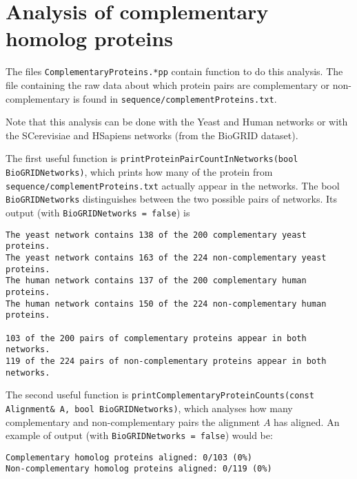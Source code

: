 \documentclass[]{article}
\begin{document}
\section{Analysis of complementary homolog proteins}

The files \texttt{ComplementaryProteins.*pp} contain function to do this analysis. The file containing the raw data about which protein pairs are complementary or non-complementary is found in \texttt{sequence/complementProteins.txt}.

Note that this analysis can be done with the Yeast and Human networks or with the SCerevisiae and HSapiens networks (from the BioGRID dataset).

The first useful function is \texttt{printProteinPairCountInNetworks(bool BioGRIDNetworks)}, which prints how many of the protein from \texttt{sequence/complementProteins.txt} actually appear in the networks. The bool \texttt{BioGRIDNetworks} distinguishes between the two possible pairs of networks. Its output (with \texttt{BioGRIDNetworks = false}) is
\begin{verbatim}
The yeast network contains 138 of the 200 complementary yeast proteins.
The yeast network contains 163 of the 224 non-complementary yeast proteins.
The human network contains 137 of the 200 complementary human proteins.
The human network contains 150 of the 224 non-complementary human proteins.

103 of the 200 pairs of complementary proteins appear in both networks.
119 of the 224 pairs of non-complementary proteins appear in both networks.
\end{verbatim}
The second useful function is \texttt{printComplementaryProteinCounts(const Alignment\& A, bool BioGRIDNetworks)}, which analyses how many complementary and non-complementary pairs the alignment $A$ has aligned. An example of output (with \texttt{BioGRIDNetworks = false}) would be:
\begin{verbatim}
Complementary homolog proteins aligned: 0/103 (0%)
Non-complementary homolog proteins aligned: 0/119 (0%)
\end{verbatim}
\end{document}

